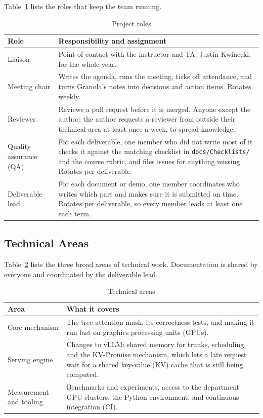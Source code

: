 \documentclass{article}
\begin{document}
Table~\ref{TblProjectRoles} lists the roles that keep the team running.

\begin{table}[H]
\caption{Project roles} \label{TblProjectRoles}
\begin{tabularx}{\textwidth}{lX}
\toprule
\textbf{Role} & \textbf{Responsibility and assignment}\\
\midrule
Liaison & Point of contact with the instructor and TA. Justin Kwinecki,
for the whole year.\\
Meeting chair & Writes the agenda, runs the meeting, ticks off attendance,
and turns Granola's notes into decisions and action items. Rotates
weekly.\\
Reviewer & Reviews a pull request before it is merged. Anyone except the
author; the author requests a reviewer from outside their technical area
at least once a week, to spread knowledge.\\
Quality assurance (QA) & For each deliverable, one member who did not
write most of it checks it against the matching checklist in
\texttt{docs/Checklists/} and the course rubric, and files issues for
anything missing. Rotates per deliverable.\\
Deliverable lead & For each document or demo, one member coordinates who
writes which part and makes sure it is submitted on time. Rotates per
deliverable, so every member leads at least one each term.\\
\bottomrule
\end{tabularx}
\end{table}

\subsection{Technical Areas}

Table~\ref{TblAreas} lists the three broad areas of technical work.
Documentation is shared by everyone and coordinated by the deliverable
lead.

\begin{table}[H]
\caption{Technical areas} \label{TblAreas}
\begin{tabularx}{\textwidth}{lX}
\toprule
\textbf{Area} & \textbf{What it covers}\\
\midrule
Core mechanism & The tree attention mask, its correctness tests, and
making it run fast on graphics processing units (GPUs).\\
Serving engine & Changes to vLLM: shared memory for trunks, scheduling,
and the KV-Promise mechanism, which lets a late request wait for a shared
key-value (KV) cache that is still being computed.\\
Measurement and tooling & Benchmarks and experiments, access to the
department GPU clusters, the Python environment, and continuous
integration (CI).\\
\bottomrule
\end{tabularx}
\end{table}
\end{document}

